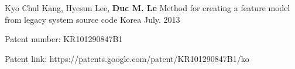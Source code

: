 \vspace{-1mm}

\begin{cventries}


\cventry
{Kyo Chul Kang, Hyesun Lee, \textbf{Duc M. Le}} %
{Method for creating a feature model from legacy system source code }%
{Korea} %
{July. 2013} %
{
	\begin{cvitems} %
		\item Patent number: KR101290847B1
		\item Patent link: https://patents.google.com/patent/KR101290847B1/ko
	\end{cvitems}
}

\end{cventries}